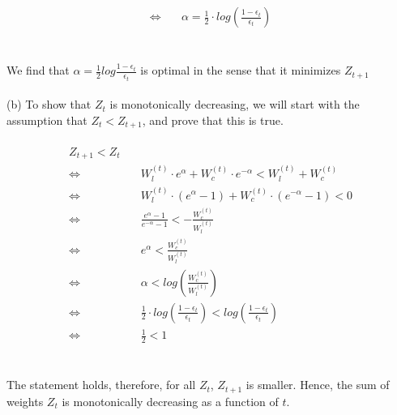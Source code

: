 \documentclass{article}
\begin{document}
\begin{align*}
	\Longleftrightarrow & \quad \boxed{\alpha = \frac{1}{2} \cdot log\left(\frac{1-\epsilon_t}{\epsilon_t}\right)}
\end{align*}\\
\\
We find that $\alpha = \frac{1}{2} log \frac{1-\epsilon_t}{\epsilon_t}$ is optimal in the sense that it minimizes $Z_{t+1}$\\
\\

(b) To show that $Z_t$ is monotonically decreasing, we will start with the assumption that $Z_t < Z_{t+1}$, and prove that this is true.\\
\\

\begin{align*}
	Z_{t+1} < Z_t&\\
	\Longleftrightarrow & \quad W_l^{(t)} \cdot e^\alpha + W_c^{(t)} \cdot e^{-\alpha} < W_l^{(t)} + W_c^{(t)}\\
	\Longleftrightarrow & \quad W_l^{(t)} \cdot (e^\alpha - 1) + W_c^{(t)} \cdot (e^{-\alpha} - 1) < 0\\
	\Longleftrightarrow & \quad \frac{e^\alpha - 1}{e^{-\alpha} - 1} < - \frac{W_c^{(t)}}{W_l^{(t)}}\\
	\Longleftrightarrow & \quad e^\alpha < \frac{W_c^{(t)}}{W_l^{(t)}}\\
	\Longleftrightarrow & \quad \alpha < log\left(\frac{W_c^{(t)}}{W_l^{(t)}}\right)\\
	\Longleftrightarrow & \quad \frac{1}{2} \cdot log\left(\frac{1-\epsilon_t}{\epsilon_t}\right) < log\left(\frac{1-\epsilon_t}{\epsilon_t}\right)\\
	\Longleftrightarrow & \quad \boxed{\frac{1}{2} < 1}
\end{align*}
\\
\\
The statement holds, therefore, for all $Z_t$, $Z_{t+1}$ is smaller. Hence, the sum of weights $Z_t$ is monotonically decreasing as a function of $t$.
\end{document}

